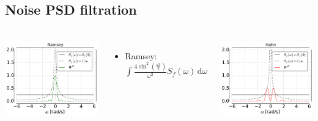 \documentclass[aspectratio=169, 13pt, t]{beamer}
\newcommand{\diff}{\,\mathrm{d}}
\begin{document}
\subsection{Noise PSD filtration}
\begin{frame}[t]\frametitle{\secname}\framesubtitle{\subsecname}
\begin{columns}[c]
\centering\includegraphics[width=\textwidth]{ramsey_filter}

\vspace{0.1cm}
\begin{itemize}
\item Ramsey: $\int  \frac{4 \sin^2(\frac{\omega t}{2})}{\omega^2} S_f(\omega)\diff \omega $ 
\end{itemize}
\centering\includegraphics[width=\textwidth]{hahn_filter}


\end{columns}
\end{frame}
\end{document}
